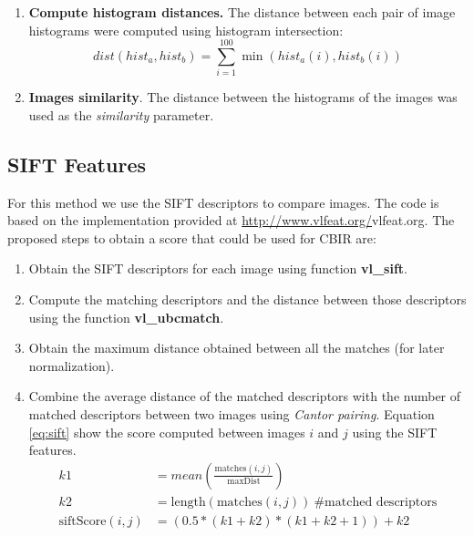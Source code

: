\documentclass[a4paper,12pt]{article}
\begin{document}
\begin{enumerate}
\begin{figure}[h]
            \label{fig:spechist}
        \end{figure}
    \item \textbf{Compute histogram distances.} The distance between
        each pair of image histograms were computed using histogram intersection:
        \begin{equation}
            dist(hist_a,hist_b) = \sum_{i=1}^{100} \min( hist_a(i), hist_b(i))
        \end{equation}
    \item \textbf{Images similarity}. The distance between the histograms
        of the images was used as the \emph{similarity} parameter. 
\end{enumerate}

\subsection{SIFT Features}
For this method we use the SIFT descriptors to compare images. The code is based on  
the implementation provided at \url{http://www.vlfeat.org/}{vlfeat.org}. The proposed steps
to obtain a score that could be used for CBIR are:

\begin{enumerate}
    \item Obtain the SIFT descriptors for each image using function \textbf{vl\_sift}. 
    \item Compute the matching descriptors and the distance between those descriptors using
        the function \textbf{vl\_ubcmatch}.
    \item Obtain the maximum distance obtained between all the matches (for later normalization).
    \item Combine the average distance of the matched descriptors with the 
        number of matched descriptors between two images using \emph{Cantor pairing}. Equation \ref{eq:sift}
        show the score computed between images $i$ and $j$ using the SIFT features.
        \begin{equation}
            \begin{split}
                k1 & = mean( \frac{\text{matches}(i,j)}{\text{maxDist}})\\
                k2 & = \text{length}(\text{matches}(i,j)) ~ \text{\# matched descriptors}\\
                \text{siftScore}(i,j) & =  (0.5*(k1+k2)*(k1+k2+1))+k2
            \end{split}
            \label{eq:sift}
        \end{equation}
\end{enumerate}
\end{document}

